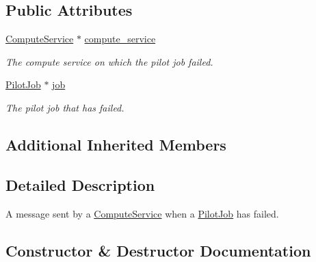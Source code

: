 \subsection*{Public Attributes}
\begin{DoxyCompactItemize}
\item 
\mbox{\label{classwrench_1_1_compute_service_pilot_job_failed_message_a26694be89e2acf2f555ce091a4a436f2}} 
\hyperlink{classwrench_1_1_compute_service}{Compute\+Service} $\ast$ \hyperlink{classwrench_1_1_compute_service_pilot_job_failed_message_a26694be89e2acf2f555ce091a4a436f2}{compute\+\_\+service}
\begin{DoxyCompactList}\small\item\em The compute service on which the pilot job failed. \end{DoxyCompactList}\item 
\mbox{\label{classwrench_1_1_compute_service_pilot_job_failed_message_a443350770e6fbf93573325da11b61b42}} 
\hyperlink{classwrench_1_1_pilot_job}{Pilot\+Job} $\ast$ \hyperlink{classwrench_1_1_compute_service_pilot_job_failed_message_a443350770e6fbf93573325da11b61b42}{job}
\begin{DoxyCompactList}\small\item\em The pilot job that has failed. \end{DoxyCompactList}\end{DoxyCompactItemize}
\subsection*{Additional Inherited Members}


\subsection{Detailed Description}
A message sent by a \hyperlink{classwrench_1_1_compute_service}{Compute\+Service} when a \hyperlink{classwrench_1_1_pilot_job}{Pilot\+Job} has failed. 

\subsection{Constructor \& Destructor Documentation}
\mbox{\label{classwrench_1_1_compute_service_pilot_job_failed_message_ad3875966abe48e0875e385d7ece80e9f}} 
